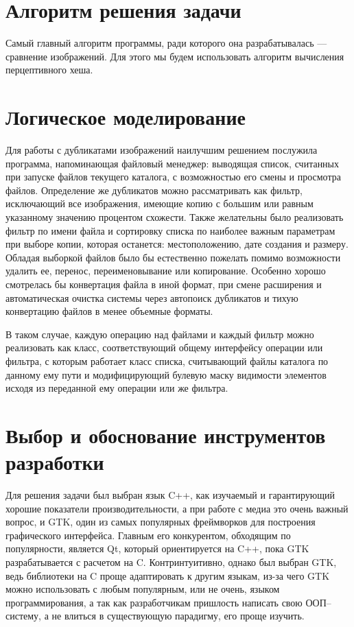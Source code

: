 \documentclass[variant=courcework]{bsuir}
\begin{document}
\section{Алгоритм решения задачи}

Самый главный алгоритм программы, ради которого она разрабатывалась ---
сравнение изображений. Для этого мы будем использовать
алгоритм вычисления перцептивного хеша.


\section{Логическое моделирование}

Для работы с дубликатами изображений наилучшим решением послужила программа,
напоминающая файловый менеджер: выводящая список, считанных при запуске файлов
текущего каталога, с возможностью его смены и просмотра файлов. Определение же
дубликатов можно рассматривать как фильтр, исключающий все изображения, имеющие
копию с большим или равным указанному значению процентом схожести. Также
желательны было реализовать фильтр по имени файла и сортировку списка по
наиболее важным параметрам при выборе копии, которая останется: местоположению,
дате создания и размеру. Обладая выборкой файлов было бы естественно пожелать
помимо возможности удалить ее, перенос, переименовывание или копирование.
Особенно хорошо смотрелась бы конвертация файла в иной формат, при смене
расширения и автоматическая очистка системы через автопоиск дубликатов и тихую
конвертацию файлов в менее объемные форматы.

В таком случае, каждую операцию над файлами и каждый фильтр можно реализовать
как класс, соответствующий общему интерфейсу операции или фильтра, с которым
работает класс списка, считывающий файлы каталога по данному ему пути и
модифицирующий булевую маску видимости элементов исходя из переданной ему
операции или же фильтра.


\section{Выбор и обоснование инструментов разработки}

Для решения задачи был выбран язык C++, как изучаемый и гарантирующий хорошие
показатели производительности, а при работе с медиа это очень важный вопрос, и
GTK, один из самых популярных фреймворков для построения графического
интерфейса. Главным его конкурентом, обходящим по популярности, является Qt,
который ориентируется на C++, пока GTK разрабатывается с расчетом на C.
Контринтуитивно, однако был выбран GTK, ведь библиотеки на C проще адаптировать
к другим языкам, из-за чего GTK можно использовать с любым популярным, или не
очень, языком программирования, а так как разработчикам пришлость написать свою
ООП--систему, а не влиться в существующую парадигму, его проще изучить.
\end{document}
